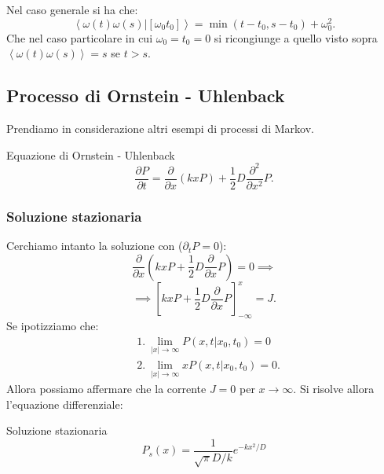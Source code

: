 \begin{itemize}
    Nel caso generale si ha che:
    \[
        \left<\omega (t)\omega (s)| \left[\omega_0t_0\right]\right> = \min(t-t_0, s-t_0) + \omega_0^2
    .\] 
    Che nel caso particolare in cui $\omega_0=t_0=0$ si ricongiunge a quello visto sopra $\left<\omega (t) \omega (s) \right> = s$ se $t>s$.
    \usetikzlibrary{math}
    \begin{center}
    \end{center}
    \noindent
\end{itemize}

\subsection{Processo di Ornstein - Uhlenback}%
\label{sub:Processo di Ornstein - Uhlenback}
Prendiamo in considerazione altri esempi di processi di Markov.
\begin{redbox}{Equazione di Ornstein - Uhlenback}
    \[
	\frac{\partial P}{\partial t} = \frac{\partial }{\partial x} (kxP) + \frac{1}{2}D\frac{\partial ^2}{\partial x^2} P
    .\] 
\end{redbox}
\noindent
\subsubsection{Soluzione stazionaria}%
\label{subsub:Soluzione stazionaria}
Cerchiamo intanto la soluzione con ($\partial_{t}P=0$):
\[
    \frac{\partial }{\partial x} \left(kxP + \frac{1}{2}D \frac{\partial }{\partial x} P\right) = 0 \implies
\] 
\[
    \implies  \left[kxP + \frac{1}{2}D \frac{\partial }{\partial x} P\right]_{-\infty}^{x} = J
.\] 
Se ipotizziamo che:
\[\begin{aligned}
    & 1. \ \lim_{\left|x\right| \to \infty} P(x, t|x_0,t_0) = 0 \\
    & 2. \ \lim_{\left|x\right| \to \infty} xP(x, t|x_0,t_0) = 0
.\end{aligned}\]
Allora possiamo affermare che la corrente $J=0$ per $x\to \infty$. Si risolve allora l'equazione differenziale:
\begin{bluebox}{Soluzione stazionaria}
    \begin{equation}
	P_s(x) = \frac{1}{\sqrt{\pi} D /k}e^{-kx^2 / D} \label{eq:5_staz}
    \end{equation}
\end{bluebox}
\noindent
